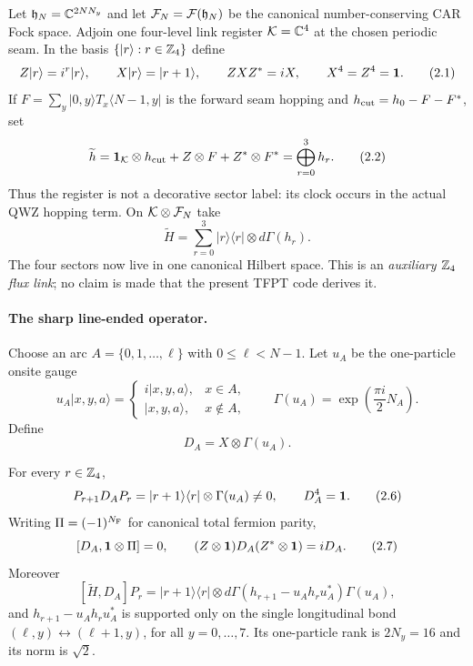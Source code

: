 Let $\mathfrak h_N=\mathbb C^{2NN_y}$ and let $\mathcal F_N=\mathcal F(\mathfrak h_N)$ be the
canonical number-conserving CAR Fock space.  Adjoin one four-level link
register $\mathcal K=\mathbb C^4$ at the chosen periodic seam.  In the basis
$\{|r\rangle:r\in\mathbb Z_4\}$ define
\[
 Z|r\rangle=i^r|r\rangle,\qquad X|r\rangle=|r+1\rangle,
 \qquad ZXZ^*=iX,\qquad X^4=Z^4=\mathbf 1.
\tag{2.1}
\]
If $F=\sum_y |0,y\rangle T_x\langle N-1,y|$ is the forward seam hopping and
$h_{\rm cut}=h_0-F-F^*$, set
\[
 \widetilde h
 =\mathbf 1_{\mathcal K}\otimes h_{\rm cut}+Z\otimes F+Z^*\otimes F^*
 =\bigoplus_{r=0}^3 h_r.
\tag{2.2}
\]
Thus the register is not a decorative sector label: its clock occurs in the
actual QWZ hopping term.  On $\mathcal K\otimes\mathcal F_N$ take
\[
 \widetilde H=\sum_{r=0}^3 |r\rangle\langle r|
 \otimes d\Gamma(h_r).
\tag{2.3}
\]
The four sectors now live in one canonical Hilbert space.  This is an
\emph{auxiliary $\mathbb Z_4$ flux link}; no claim is made that the present TFPT
code derives it.

\paragraph{The sharp line-ended operator.}

Choose an arc $A=\{0,1,\ldots,\ell\}$ with $0\le\ell<N-1$.  Let $u_A$ be
the one-particle onsite gauge
\[
 u_A|x,y,a\rangle=
 \begin{cases}
 i|x,y,a\rangle,&x\in A,\\
 |x,y,a\rangle,&x\notin A,
 \end{cases}
 \qquad
 \Gamma(u_A)=\exp\!\left(\frac{\pi i}{2}N_A\right).
\tag{2.4}
\]
Define
\[
 D_A=X\otimes\Gamma(u_A).
\tag{2.5}
\]

\begin{theorem}
For every $r\in\mathbb Z_4$,
\[
 P_{r+1}D_AP_r
 =|r+1\rangle\langle r|\otimes\Gamma(u_A)\ne0,
 \qquad D_A^4=\mathbf 1.
\tag{2.6}
\]
Writing $\Pi=(-1)^{N_{\rm F}}$ for canonical total fermion parity,
\[
 [D_A,\mathbf 1\otimes\Pi]=0,\qquad
 (Z\otimes\mathbf 1)D_A(Z^*\otimes\mathbf 1)=iD_A.
\tag{2.7}
\]
Moreover
\[
 [\widetilde H,D_A]P_r
 =|r+1\rangle\langle r|\otimes
 d\Gamma\!\left(h_{r+1}-u_Ah_ru_A^*\right)\Gamma(u_A),
\tag{2.8}
\]
and $h_{r+1}-u_Ah_ru_A^*$ is supported only on the single longitudinal
bond $(\ell,y)\leftrightarrow(\ell+1,y)$, for all $y=0,\ldots,7$.
Its one-particle rank is $2N_y=16$ and its norm is $\sqrt2$.
\end{theorem}

